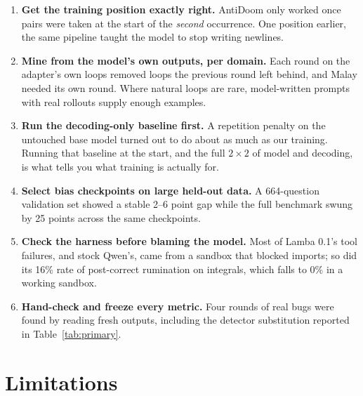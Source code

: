 \documentclass[11pt]{article}
\begin{document}
\begin{enumerate}
  \item \textbf{Get the training position exactly right.} AntiDoom only worked once pairs were taken at the start of the \emph{second} occurrence. One position earlier, the same pipeline taught the model to stop writing newlines.
  \item \textbf{Mine from the model's own outputs, per domain.} Each round on the adapter's own loops removed loops the previous round left behind, and Malay needed its own round. Where natural loops are rare, model-written prompts with real rollouts supply enough examples.
  \item \textbf{Run the decoding-only baseline first.} A repetition penalty on the untouched base model turned out to do about as much as our training. Running that baseline at the start, and the full $2\times2$ of model and decoding, is what tells you what training is actually for.
  \item \textbf{Select bias checkpoints on large held-out data.} A 664-question validation set showed a stable 2--6 point gap while the full benchmark swung by 25 points across the same checkpoints.
  \item \textbf{Check the harness before blaming the model.} Most of Lamba 0.1's tool failures, and stock Qwen's, came from a sandbox that blocked imports; so did its 16\% rate of post-correct rumination on integrals, which falls to 0\% in a working sandbox.
  \item \textbf{Hand-check and freeze every metric.} Four rounds of real bugs were found by reading fresh outputs, including the detector substitution reported in Table~\ref{tab:primary}.
\end{enumerate}

\section{Limitations}
\label{sec:limits}
\end{document}
